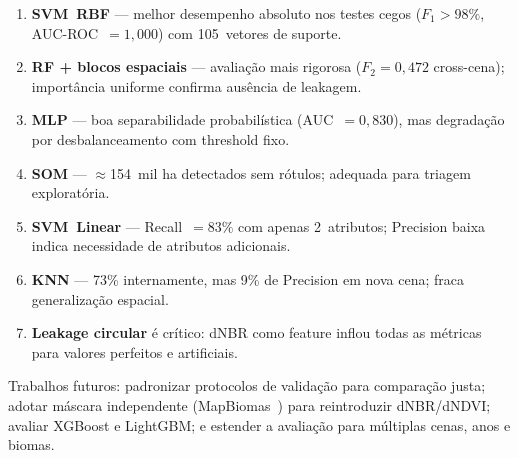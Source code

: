 \documentclass[conference]{IEEEtran}
\begin{document}
\begin{enumerate}
  \item \textbf{SVM~RBF} — melhor desempenho absoluto nos testes cegos
        ($F_1 > 98\%$, AUC-ROC~$= 1{,}000$) com 105~vetores de suporte.
  \item \textbf{RF + blocos espaciais} — avaliação mais rigorosa
        ($F_2 = 0{,}472$ cross-cena); importância uniforme confirma
        ausência de leakagem.
  \item \textbf{MLP} — boa separabilidade probabilística
        (AUC~$= 0{,}830$), mas degradação por desbalanceamento com
        threshold fixo.
  \item \textbf{SOM} — $\approx$154~mil ha detectados sem rótulos;
        adequada para triagem exploratória.
  \item \textbf{SVM~Linear} — Recall~$= 83\%$ com apenas 2~atributos;
        Precision baixa indica necessidade de atributos adicionais.
  \item \textbf{KNN} — 73\% internamente, mas 9\% de Precision em nova
        cena; fraca generalização espacial.
  \item \textbf{Leakage circular} é crítico: dNBR como feature inflou
        todas as métricas para valores perfeitos e artificiais.
\end{enumerate}

Trabalhos futuros: padronizar protocolos de validação para comparação
justa; adotar máscara independente (MapBiomas~\cite{b6}) para
reintroduzir dNBR/dNDVI; avaliar XGBoost e LightGBM; e estender a
avaliação para múltiplas cenas, anos e biomas.
\end{document}
